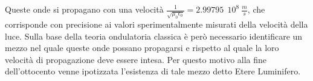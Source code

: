Queste onde si propagano con una velocità $\frac{1}{\sqrt{\mu_0\epsilon_0}}=2.99795\ \ 10^8\  \frac{m}{s}$, 
che corrisponde con precisione ai valori sperimentalmente misurati della velocità della luce. 
Sulla base della teoria ondulatoria classica è però necessario identificare un mezzo nel quale queste onde possano 
propagarsi e rispetto al quale la loro velocità di propagazione deve essere intesa. Per questo motivo alla fine dell'ottocento venne ipotizzata l'esistenza di tale mezzo detto Etere Luminifero.

 
